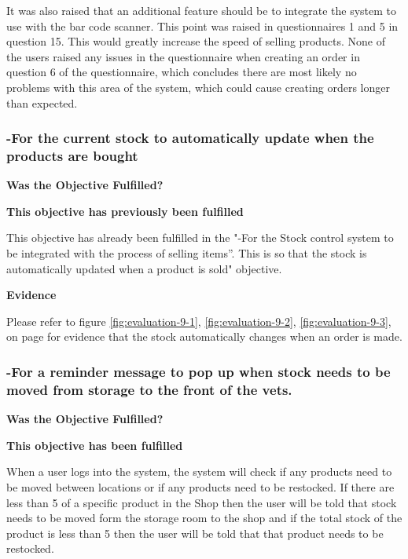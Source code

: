 It was also raised that an additional feature should be to integrate the system to use with the bar code scanner. This point was raised in questionnaires 1 and 5 in question 15. This would greatly increase the speed of selling products. None of the users raised any issues in the questionnaire when creating an order in question 6 of the questionnaire, which concludes there are most likely no problems with this area of the system, which could cause creating orders longer than expected.




\pagebreak
\subsubsection{-For the current stock to automatically update when the products are bought}
\textbf{Was the Objective Fulfilled?} \newline

\textbf{\large{This objective has previously been fulfilled}}

This objective has already been fulfilled in the "-For the Stock control system to be integrated with the process of selling items''. This is so that the stock is automatically updated when a product is sold" objective.

\textbf{Evidence} \newline

Please refer to figure \ref{fig:evaluation-9-1}, \ref{fig:evaluation-9-2}, \ref{fig:evaluation-9-3}, on  page \pageref{automatic-stock-evidence} for evidence that the stock automatically changes when an order is made.



\pagebreak
\subsubsection{-For a reminder message to pop up when stock needs to be moved from storage to the front of the vets. }
\textbf{Was the Objective Fulfilled?} \newline

\textbf{\large{This objective has been fulfilled}}

When a user logs into the system, the system will check if any products need to be moved between locations or if any products need to be restocked. If there are less than 5 of a specific product in the Shop then the user will be told that stock needs to be moved form the storage room to the shop and if the total stock of the product is less than 5 then the user will be told that that product needs to be restocked.\newline

